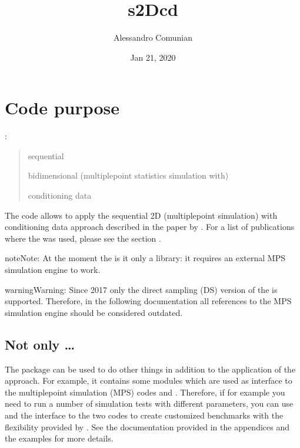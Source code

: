 \documentclass[letterpaper,10pt,english]{sphinxmanual}
\title{s2Dcd}
\date{Jan 21, 2020}
\author{Alessandro Comunian}
\let\sphinxpxdimen\pdfpxdimen\else\newdimen\sphinxpxdimen
\begin{document}
\pagestyle{empty}
\sphinxmaketitle
\pagestyle{plain}
\sphinxtableofcontents
\pagestyle{normal}
\label{\detokenize{index::doc}}
\begin{figure}[htbp]
\centering

\noindent\sphinxincludegraphics[width=200\sphinxpxdimen]{{logo_thom}.png}
\end{figure}




\chapter{Code purpose}
\label{\detokenize{purpose:code-purpose}}\label{\detokenize{purpose::doc}}
 :
\begin{quote}

   sequential

  bi\sphinxhyphen{}dimensional (multiple\sphinxhyphen{}point statistics simulation with)

 conditioning data
\end{quote}

The code  allows to apply the sequential 2D (multiple\sphinxhyphen{}point
simulation) with conditioning data approach described in the paper by
. For a list of publications where the  was
used, please see the section .

\begin{sphinxadmonition}{note}{Note:}
At the moment the  is it only a 
library: it requires an external MPS simulation engine to work.
\end{sphinxadmonition}

\begin{sphinxadmonition}{warning}{Warning:}
Since 2017 only the direct sampling (DS) version of the
 is supported. Therefore, in the following
documentation all references to the  MPS
simulation engine should be considered outdated.
\end{sphinxadmonition}


\section{Not only …}
\label{\detokenize{purpose:not-only-s2dcd}}
The package can be used to do other things in addition to the
application of the  approach. For example, it contains some
modules which are used as interface to the multiple\sphinxhyphen{}point simulation
(MPS) codes  and . Therefore, if for example you need
to run a number of simulation tests with different parameters, you can
use  and the interface to the two codes to create customized
benchmarks with the flexibility provided by . See the
documentation provided in the appendices and the examples for more
details.
\end{document}
